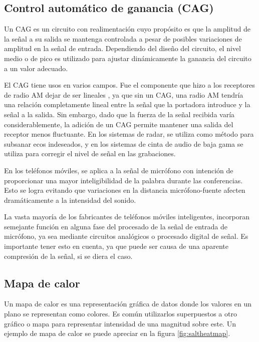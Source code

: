 \subsection{Control automático de ganancia (CAG)}
    Un \ac{CAG} es un circuito con realimentación cuyo propósito es que la amplitud de la señal a su salida se mantenga controlada a pesar de posibles variaciones de amplitud en la señal de entrada. Dependiendo del diseño del circuito, el nivel medio o de pico es utilizado para ajustar dinámicamente la ganancia del circuito a un valor adecuado.

    El \ac{CAG} tiene usos en varios campos. Fue el componente que hizo a los receptores de radio AM dejar de ser lineales \cite[cap. 27 sec. 3]{radiotron}, ya que sin un \ac{CAG}, una radio AM tendría una relación completamente lineal entre la señal que la portadora introduce y la señal a la salida. Sin embargo, dado que la fuerza de la señal recibida varía considerablemente, la adición de un \ac{CAG} permite mantener una salida del receptor menos fluctuante. En los sistemas de radar, se utiliza como método para subsanar ecos indeseados, y en los sistemas de cinta de audio de baja gama se utiliza para corregir el nivel de señal en las grabaciones.

    En los teléfonos móviles, se aplica a la señal de micrófono con intención de proporcionar una mayor inteligibilidad de la palabra durante las conferencias. Esto se logra evitando que variaciones en la distancia micrófono-fuente afecten dramáticamente a la intensidad del sonido.

    La vasta mayoría de los fabricantes de teléfonos móviles inteligentes, incorporan semejante función en alguna fase del procesado de la señal de entrada de micrófono, ya sea mediante circuitos analógicos o procesado digital de señal. Es importante tener esto en cuenta, ya que puede ser causa de una aparente compresión de la señal, si se diera el caso. 

\FloatBarrier
\subsection{Mapa de calor}
    Un mapa de calor es una representación gráfica de datos donde los valores en un plano se representan como colores. Es común utilizarlos superpuestos a otro gráfico o mapa para representar intensidad de una magnitud sobre este. Un ejemplo de mapa de calor se puede apreciar en la figura \ref{fig:saltheatmap}.

